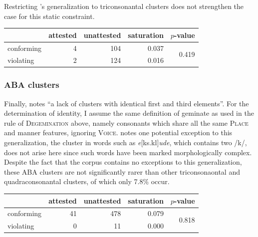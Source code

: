 Restricting \citeauthor{Pierrehumbert1994}'s generalization to triconsonantal clusters does not strengthen the case for this static constraint.


\begin{example}
\begin{tabular}{l r r r r}
\toprule
           & attested & unattested & saturation & $p$-value \\
\midrule
conforming & 4        & 104        & 0.037      & \multirow{2}{*}{0.419} \\
violating  & 2        & 124        & 0.016                               \\
\bottomrule
\end{tabular} 
\end{example}


\subsubsection{ABA clusters}

Finally, \citet[][176]{Pierrehumbert1994} notes ``a lack of clusters with identical first and third elements''. For the determination of identity, I assume the same definition of geminate as used in the rule of \textsc{Degemination} above, namely consonants which share all the same \textsc{Place} and manner features, ignoring \textsc{Voice}. 
\citeauthor{Pierrehumbert1994} notes one potential exception to this generalization, the cluster in words such as \emph{e}[ks.kl]\emph{ude}, which contains two /k/, does not arise here since such words have been marked morphologically complex. Despite the fact that the corpus contains no exceptions to this generalization, these \textsc{ABA} clusters are not significantly rarer than other triconsonaontal and quadraconsonantal clusters, of which only 7.8\% occur. 

\begin{example}
\begin{tabular}{l r r r r}
\toprule
           & attested & unattested & saturation & $p$-value \\
\midrule
conforming & 41       & 478        & 0.079      & \multirow{2}{*}{0.818} \\
violating  &  0       &  11        & 0.000                               \\
\bottomrule
\end{tabular}
\end{example}

